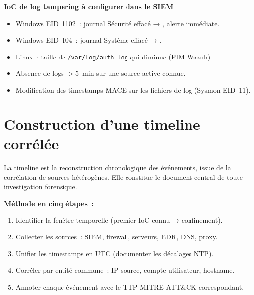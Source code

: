 \begin{boxioc}
\textbf{IoC de log tampering à configurer dans le SIEM}
\begin{itemize}
  \item Windows EID~1102~: journal Sécurité effacé → , alerte immédiate.
  \item Windows EID~104~: journal Système effacé → .
  \item Linux~: taille de \texttt{/var/log/auth.log} qui diminue (FIM Wazuh).
  \item Absence de logs $>5$~min sur une source active connue.
  \item Modification des timestamps MACE sur les fichiers de log (Sysmon EID~11).
\end{itemize}
\end{boxioc}

\section{Construction d'une timeline corrélée}
\label{sec:timeline}

La timeline est la reconstruction chronologique des événements, issue de la
corrélation de sources hétérogènes. Elle constitue le document central de
toute investigation forensique.

\textbf{Méthode en cinq étapes~:}
\begin{enumerate}
  \item Identifier la fenêtre temporelle (premier IoC connu → confinement).
  \item Collecter les sources~: SIEM, firewall, serveurs, EDR, DNS, proxy.
  \item Unifier les timestamps en UTC (documenter les décalages NTP).
  \item Corréler par entité commune~: IP source, compte utilisateur, hostname.
  \item Annoter chaque événement avec le TTP MITRE ATT\&CK correspondant.
\end{enumerate}

